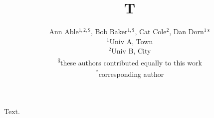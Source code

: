 \documentclass{article}
\title{T}
\author{Ann Able$^{1,2,\$}$, Bob Baker$^{1,\$}$, Cat Cole$^{2}$, Dan Dorn$^{1}$* \vspace{0.5cm} \\
$^{1}$Univ A, Town\\
$^{2}$Univ B, City \vspace{0.5cm} \\
\textsuperscript{\$}these authors contributed equally to this work\\
\textsuperscript{*}corresponding author}
\date{}
\begin{document}
\maketitle
Text.
\end{document}
